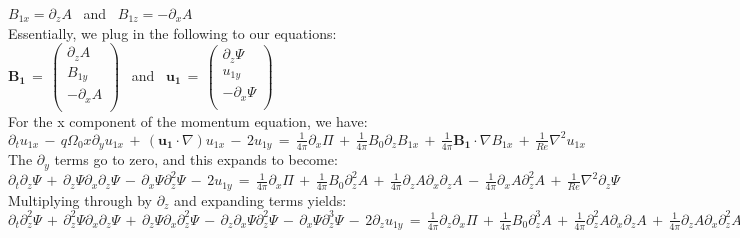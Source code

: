 \documentclass[letterpaper,12pt]{article}
\newcommand\reye{\mathrel{Re}}
\begin{document}
$B_{1x} = \partial_z A$ \, and \, $B_{1z} = - \partial_x A$ \\

Essentially, we plug in the following to our equations: \\

$\mathbf{B_1} \, = \, \left(\begin{matrix}

\partial_zA \\
B_{1y} \\
-\partial_xA \\

\end{matrix}\right)$ \, and \, $\mathbf{u_1} \, = \, \left(\begin{matrix}

\partial_z\Psi \\
u_{1y} \\
-\partial_x\Psi \\
\end{matrix}\right)$ \\

For the x component of the momentum equation, we have: \\

$\partial_t u_{1x} \, - \, q \Omega_0 x \partial_y u_{1x} \, + \, \left(\mathbf{u_1} \cdot \nabla\right) u_{1x} \, - \, 2 u_{1y} \, = \, \frac{1}{4\pi} \partial_x \Pi \, + \, \frac{1}{4\pi} B_0 \partial_z B_{1x} \, + \, \frac{1}{4\pi} \mathbf{B_1} \cdot \nabla B_{1x} \, + \, \frac{1}{\reye}\nabla^2 u_{1x} $ \\

The $\partial_y$ terms go to zero, and this expands to become: \\

$\partial_t\partial_z\Psi \, + \, \partial_z\Psi \partial_x \partial_z \Psi \, - \, \partial_x \Psi \partial_z^2\Psi \, - \, 2 u_{1y} \, = \, \frac{1}{4\pi}\partial_x \Pi \, + \, \frac{1}{4\pi} B_0 \partial_z^2 A \, + \, \frac{1}{4\pi} \partial_z A \partial_x \partial_z A \, - \, \frac{1}{4\pi} \partial_x A \partial_z^2 A \, + \, \frac{1}{\reye} \nabla^2 \partial_z \Psi$ \\

Multiplying through by $\partial_z$ and expanding terms yields: \\

$\partial_t \partial_z^2 \Psi \, + \, \partial_z^2\Psi\partial_x\partial_z\Psi \, + \, \partial_z\Psi \partial_x\partial_z^2 \Psi \, - \, \partial_z\partial_x\Psi\partial_z^2\Psi \, - \, \partial_x \Psi \partial_z^3 \Psi \, - \, 2\partial_z u_{1y} \, = \, \frac{1}{4\pi}\partial_z\partial_x\Pi \, + \, \frac{1}{4\pi} B_0\partial_z^3A \, + \, \frac{1}{4\pi}\partial_z^2 A \partial_x \partial_z A \, + \, \frac{1}{4\pi}\partial_zA\partial_x\partial_z^2 A \, - \, \frac{1}{4\pi}\partial_z\partial_x A \partial_z^2 A \, - \, \frac{1}{4\pi}\partial_xA\partial_z^3A \, + \, \frac{1}{\reye} \nabla^2 \partial_z^2 \Psi $ \\
\end{document}
